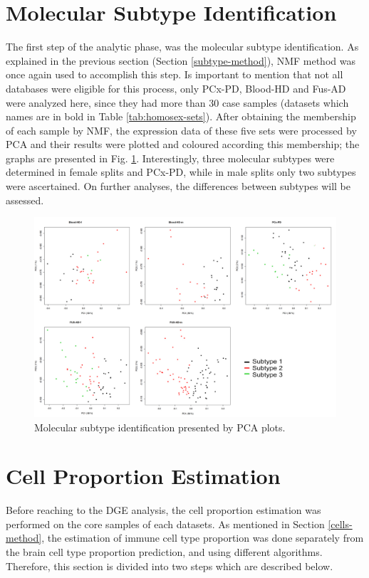 \section{Molecular Subtype Identification}

The first step of the analytic phase, was the molecular subtype identification. As explained in the previous section (Section \ref{subtype-method}), NMF method was once again used to accomplish this step. Is important to mention that not all databases were eligible for this process, only PCx-PD, Blood-HD and Fus-AD were analyzed here, since they had more than 30 case samples (datasets which names are in bold in Table \ref{tab:homosex-sets}). After obtaining the membership of each sample by NMF, the expression data of these five sets were processed by PCA and their results were plotted and coloured according this membership; the graphs are presented in Fig. \ref{fig:pca-subtype}. Interestingly, three molecular subtypes were determined in female splits and PCx-PD, while in male splits only two subtypes were ascertained. On further analyses, the differences between subtypes will be assessed.

\begin{figure}[ht]
    \centerline{\includegraphics[width = 13cm]{Figures/pca-subtype.jpg}}
\caption{Molecular subtype identification presented by PCA plots.}
\label{fig:pca-subtype}
\end{figure}

\section{Cell Proportion Estimation} \label{result-cells}

Before reaching to the DGE analysis, the cell proportion estimation was performed on the core samples of each datasets. As mentioned in Section \ref{cells-method}, the estimation of immune cell type proportion was done separately from the brain cell type proportion prediction, and using different algorithms. Therefore, this section is divided into two steps which are described below.

